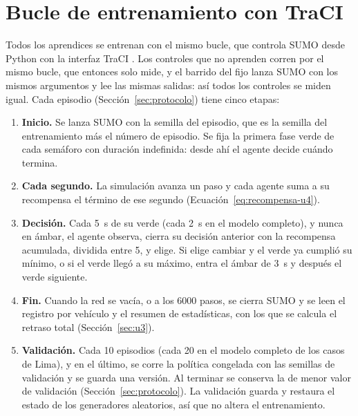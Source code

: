 \section{Bucle de entrenamiento con TraCI}
\label{sec:bucle}

Todos los aprendices se entrenan con el mismo bucle, que controla SUMO
desde Python con la interfaz TraCI \citep{TraCI_Docs}. Los controles
que no aprenden corren por el mismo bucle, que entonces solo mide, y el
barrido del fijo lanza SUMO con los mismos argumentos y lee las mismas
salidas: así todos los controles se miden igual. Cada episodio
(Sección~\ref{sec:protocolo}) tiene cinco etapas:

\begin{enumerate}
  \item \textbf{Inicio.} Se lanza SUMO con la semilla del episodio, que
    es la semilla del entrenamiento más el número de episodio. Se fija
    la primera fase verde de cada semáforo con duración indefinida:
    desde ahí el agente decide cuándo termina.
  \item \textbf{Cada segundo.} La simulación avanza un paso y cada
    agente suma a su recompensa el término de ese segundo
    (Ecuación~\ref{eq:recompensa-u4}).
  \item \textbf{Decisión.} Cada 5~s de su verde (cada 2~s en el modelo
    completo), y nunca en ámbar, el agente observa, cierra su decisión
    anterior con la recompensa acumulada, dividida entre 5, y elige. Si elige cambiar y el verde ya cumplió su mínimo,
    o si el verde llegó a su máximo, entra el ámbar de 3~s y después el
    verde siguiente.
  \item \textbf{Fin.} Cuando la red se vacía, o a los 6000 pasos, se
    cierra SUMO y se leen el registro por vehículo y el resumen de
    estadísticas, con los que se calcula el retraso total
    (Sección~\ref{sec:u3}).
  \item \textbf{Validación.} Cada 10 episodios (cada 20 en el modelo
    completo de los casos de Lima), y en el último, se
    corre la política congelada con las semillas de validación y se
    guarda una versión. Al terminar se conserva la de menor valor de
    validación (Sección~\ref{sec:protocolo}). La validación guarda y
    restaura el estado de los generadores aleatorios, así que no altera
    el entrenamiento.
\end{enumerate}

